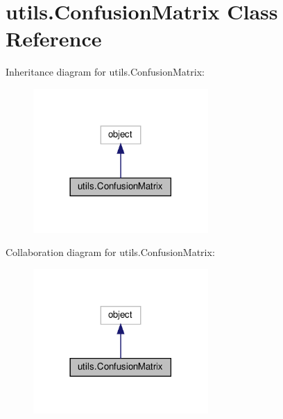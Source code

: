 \hypertarget{classutils_1_1ConfusionMatrix}{}\section{utils.\+Confusion\+Matrix Class Reference}
\label{classutils_1_1ConfusionMatrix}


Inheritance diagram for utils.\+Confusion\+Matrix\+:
\nopagebreak
\begin{figure}[H]
\begin{center}
\leavevmode
\includegraphics[width=189pt]{classutils_1_1ConfusionMatrix__inherit__graph}
\end{center}
\end{figure}


Collaboration diagram for utils.\+Confusion\+Matrix\+:
\nopagebreak
\begin{figure}[H]
\begin{center}
\leavevmode
\includegraphics[width=189pt]{classutils_1_1ConfusionMatrix__coll__graph}
\end{center}
\end{figure}
